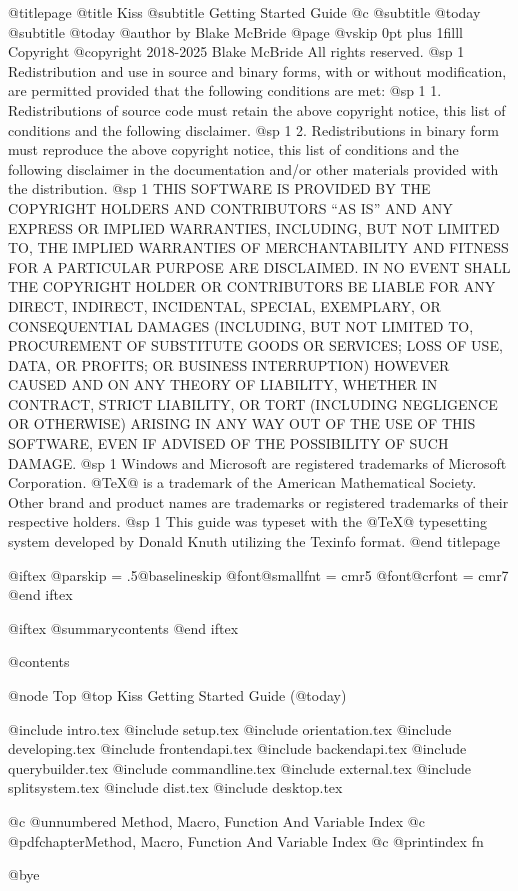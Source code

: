 @titlepage
@title Kiss
@subtitle Getting Started Guide
@c @subtitle @today{}
@subtitle @today{}
@author by Blake McBride
@page
@vskip 0pt plus 1filll
Copyright  @copyright{} 2018-2025 Blake McBride
All rights reserved.
@sp 1
Redistribution and use in source and binary forms, with or without
modification, are permitted provided that the following conditions are
met:
@sp 1
1. Redistributions of source code must retain the above copyright
notice, this list of conditions and the following disclaimer.
@sp 1
2. Redistributions in binary form must reproduce the above copyright
notice, this list of conditions and the following disclaimer in the
documentation and/or other materials provided with the distribution.
@sp 1
THIS SOFTWARE IS PROVIDED BY THE COPYRIGHT HOLDERS AND CONTRIBUTORS
``AS IS'' AND ANY EXPRESS OR IMPLIED WARRANTIES, INCLUDING, BUT NOT
LIMITED TO, THE IMPLIED WARRANTIES OF MERCHANTABILITY AND FITNESS FOR
A PARTICULAR PURPOSE ARE DISCLAIMED. IN NO EVENT SHALL THE COPYRIGHT
HOLDER OR CONTRIBUTORS BE LIABLE FOR ANY DIRECT, INDIRECT, INCIDENTAL,
SPECIAL, EXEMPLARY, OR CONSEQUENTIAL DAMAGES (INCLUDING, BUT NOT
LIMITED TO, PROCUREMENT OF SUBSTITUTE GOODS OR SERVICES; LOSS OF USE,
DATA, OR PROFITS; OR BUSINESS INTERRUPTION) HOWEVER CAUSED AND ON ANY
THEORY OF LIABILITY, WHETHER IN CONTRACT, STRICT LIABILITY, OR TORT
(INCLUDING NEGLIGENCE OR OTHERWISE) ARISING IN ANY WAY OUT OF THE USE
OF THIS SOFTWARE, EVEN IF ADVISED OF THE POSSIBILITY OF SUCH DAMAGE.
@sp 1
Windows and Microsoft are registered trademarks of
Microsoft Corporation.  @TeX{}@ is a trademark of the American
Mathematical Society. Other brand and product names are trademarks or
registered trademarks of their respective holders.
@sp 1
This guide was typeset with the @TeX{}@ typesetting system developed by
Donald Knuth utilizing the Texinfo format.
@end titlepage

@iftex
@parskip = .5@baselineskip
@font@smallfnt = cmr5
@font@crfont = cmr7
@end iftex

@iftex
@summarycontents
@end iftex

@contents

@node Top
@top Kiss Getting Started Guide (@today{})

@include intro.tex
@include setup.tex
@include orientation.tex
@include developing.tex
@include frontendapi.tex
@include backendapi.tex
@include querybuilder.tex
@include commandline.tex
@include external.tex
@include splitsystem.tex
@include dist.tex
@include desktop.tex

@c @unnumbered Method, Macro, Function And Variable Index
@c @pdfchapter{Method, Macro, Function And Variable Index}
@c @printindex fn

@bye

